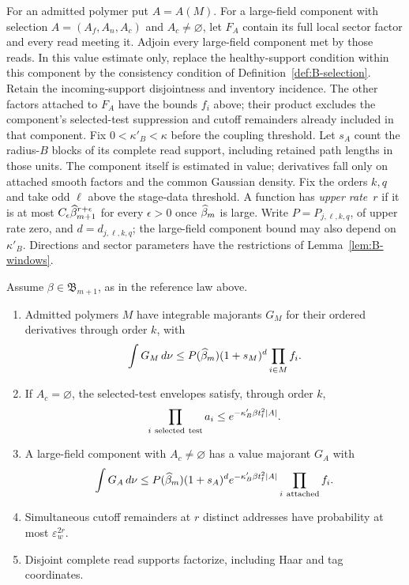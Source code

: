 For an admitted polymer put $A=A(M)$. For a large-field component with selection $A=(A_f,A_n,A_c)$ and $A_c\ne\varnothing$, let $F_A$ contain its full local sector factor and every read meeting it. Adjoin every large-field component met by those reads. In this value estimate only, replace the healthy-support condition within this component by the consistency condition of Definition~\ref{def:B-selection}. Retain the incoming-support disjointness and inventory incidence. The other factors attached to $F_A$ have the bounds $f_i$ above; their product excludes the component's selected-test suppression and cutoff remainders already included in that component. Fix $0<\kappa'_B<\kappa$ before the coupling threshold. Let $s_A$ count the radius-$B$ blocks of its complete read support, including retained path lengths in those units. The component itself is estimated in value; derivatives fall only on attached smooth factors and the common Gaussian density. Fix the orders $k,q$ and take odd $\ell$ above the stage-data threshold. A function has \emph{upper rate}~$r$ if it is at most $C_\epsilon\widehat{\beta}_{m+1}^{r+\epsilon}$ for every $\epsilon>0$ once $\widehat{\beta}_m$ is large. Write $P=P_{j,\ell,k,q}$, of upper rate zero, and $d=d_{j,\ell,k,q}$; the large-field component bound may also depend on $\kappa'_B$. Directions and sector parameters have the restrictions of Lemma~\ref{lem:B-windows}.
\begin{lemma}\label{lem:B-D2}
Assume $\beta\in\mathfrak B_{m+1}$, as in the reference law above.
\begin{enumerate}[label=(\roman*)]
\item Admitted polymers $M$ have integrable majorants $G_M$ for their ordered derivatives through order $k$, with
\begin{equation*}
\int G_M\,d\nu\le P(\widehat{\beta}_m)(1+s_M)^d\prod_{i\in M}f_i.
\end{equation*}
\item If $A_c=\varnothing$, the selected-test envelopes satisfy, through order $k$,
\begin{equation*}
\prod_{i\ {\rm selected\ test}}a_i\le e^{-\kappa'_B\beta t_{\rm f}^2|A|}.
\end{equation*}
\item A large-field component with $A_c\ne\varnothing$ has a value majorant $G_A$ with
\begin{equation*}
\int G_A\,d\nu\le P(\widehat{\beta}_m)(1+s_A)^d e^{-\kappa'_B\beta t_{\rm f}^2|A|}\prod_{i\ {\rm attached}}f_i.
\end{equation*}
\item Simultaneous cutoff remainders at $r$ distinct addresses have probability at most $\varepsilon_w^{2r}$.
\item Disjoint complete read supports factorize, including Haar and tag coordinates.
\end{enumerate}
\end{lemma}
